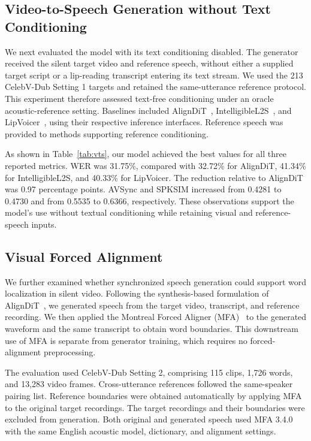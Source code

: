 \subsection{Video-to-Speech Generation without Text Conditioning}
\label{sec:vts_experiment}

We next evaluated the model with its text conditioning disabled. The generator received the silent target video and reference speech, without either a supplied target script or a lip-reading transcript entering its text stream. We used the 213 CelebV-Dub Setting 1 targets and retained the same-utterance reference protocol. This experiment therefore assessed text-free conditioning under an oracle acoustic-reference setting. Baselines included AlignDiT~\cite{choi2025aligndit}, IntelligibleL2S~\cite{choi2023intelligible}, and LipVoicer~\cite{yemini2024lipvoicer}, using their respective inference interfaces. Reference speech was provided to methods supporting reference conditioning.



As shown in Table~\ref{tab:vts}, our model achieved the best values for all three reported metrics. WER was 31.75\%, compared with 32.72\% for AlignDiT, 41.34\% for IntelligibleL2S, and 40.33\% for LipVoicer. The reduction relative to AlignDiT was 0.97 percentage points. AVSync and SPKSIM increased from 0.4281 to 0.4730 and from 0.5535 to 0.6366, respectively. These observations support the model's use without textual conditioning while retaining visual and reference-speech inputs.

\subsection{Visual Forced Alignment}
\label{sec:vfa_experiment}

We further examined whether synchronized speech generation could support word localization in silent video. Following the synthesis-based formulation of AlignDiT~\cite{choi2025aligndit}, we generated speech from the target video, transcript, and reference recording. We then applied the Montreal Forced Aligner (MFA)~\cite{mcauliffe2017mfa} to the generated waveform and the same transcript to obtain word boundaries. This downstream use of MFA is separate from generator training, which requires no forced-alignment preprocessing.

The evaluation used CelebV-Dub Setting 2, comprising 115 clips, 1,726 words, and 13,283 video frames. Cross-utterance references followed the same-speaker pairing list. Reference boundaries were obtained automatically by applying MFA to the original target recordings. The target recordings and their boundaries were excluded from generation. Both original and generated speech used MFA 3.4.0 with the same English acoustic model, dictionary, and alignment settings.

